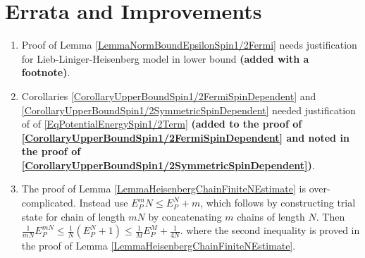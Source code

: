\chapter*{Errata and Improvements}
\begin{enumerate}
	\item Proof of Lemma \ref{LemmaNormBoundEpsilonSpin1/2Fermi} needs justification for Lieb-Liniger-Heisenberg model in lower bound \textbf{(added with a footnote)}.
	\item Corollaries \ref{CorollaryUpperBoundSpin1/2FermiSpinDependent} and \ref{CorollaryUpperBoundSpin1/2SymmetricSpinDependent} needed justification of of \eqref{EqPotentialEnergySpin1/2Term} \textbf{(added to the proof of \ref{CorollaryUpperBoundSpin1/2FermiSpinDependent} and noted in the proof of \ref{CorollaryUpperBoundSpin1/2SymmetricSpinDependent})}.
	\item The proof of Lemma \ref{LemmaHeisenbergChainFiniteNEstimate} is over-complicated. Instead use $E_P^mN\leq E_P^N+m$, which follows by constructing trial state for chain of length $mN$ by concatenating $m$ chains of length $N$. Then $\frac{1}{mN}E_P^{mN}\leq \frac{1}{N}(E_P^{N}+1)\leq \frac{1}{M}E_P^M+\frac{1}{4N}$. where the second inequality is proved in the proof of Lemma \ref{LemmaHeisenbergChainFiniteNEstimate}.
\end{enumerate}